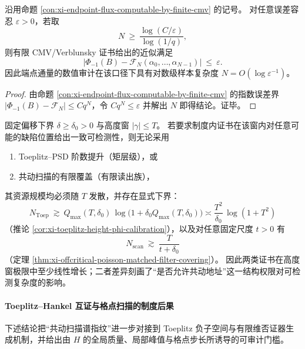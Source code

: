 \begin{corollary}\label{cor:xi-endpoint-flux-log-sample-complexity}
沿用命题 \ref{con:xi-endpoint-flux-computable-by-finite-cmv} 的记号。
对任意误差容忍 \(\varepsilon>0\)，若取
\[
N\ \ge\ \frac{\log(C/\varepsilon)}{\log(1/q)},
\]
则有限 CMV/Verblunsky 证书给出的近似满足
\[
\bigl|\Phi_{-1}(B)-\mathcal{F}_N(\alpha_0,\dots,\alpha_{N-1})\bigr|\ \le\ \varepsilon.
\]
因此端点通量的数值审计在该口径下具有对数级样本复杂度 \(N=O(\log \varepsilon^{-1})\)。
\end{corollary}
\begin{proof}
由命题 \ref{con:xi-endpoint-flux-computable-by-finite-cmv} 的指数误差界 \( |\Phi_{-1}(B)-\mathcal{F}_N|\le Cq^N \)，令 \(Cq^N\le\varepsilon\) 并解出 \(N\) 即得结论。证毕。
\end{proof}

\begin{proposition}\label{con:xi-toeplitz-vs-scan-complexity-lower-bounds}
固定偏移下界 \(\delta\ge\delta_0>0\) 与高度窗 \(|\gamma|\le T\)。
若要求制度内证书在该窗内对任意可能的缺陷位置给出一致可检测性，则无论采用
\begin{enumerate}
  \item Toeplitz--PSD 阶数提升（矩层级），或
  \item 共动扫描的有限覆盖（有限读出族），
\end{enumerate}
其资源规模均必须随 \(T\) 发散，并存在显式下界：
\[
N_{\mathrm{Toep}}\ \gtrsim\ Q_{\max}(T,\delta_0)\,\log\!\bigl(1+\delta_0 Q_{\max}(T,\delta_0)\bigr)
\asymp \frac{T^2}{\delta_0}\,\log(1+T^2)
\]
（推论 \ref{cor:xi-toeplitz-height-phi-calibration}），以及对任意固定尺度 \(t>0\) 有
\[
N_{\mathrm{scan}}\ \gtrsim\ \frac{T}{t+\delta_0}
\]
（定理 \ref{thm:xi-offcritical-poisson-matched-filter-covering}）。
因此两类证书在高度窗极限中至少线性增长；二者差异刻画了“是否允许共动地址”这一结构权限对可检测复杂度的影响。
\end{proposition}

\paragraph{Toeplitz--Hankel 互证与格点扫描的制度后果}
下述结论把“共动扫描谱指纹”进一步对接到 Toeplitz 负子空间与有限维否证器生成机制，并给出由 \(H\) 的全局质量、局部峰值与格点步长所诱导的可审计门槛。

